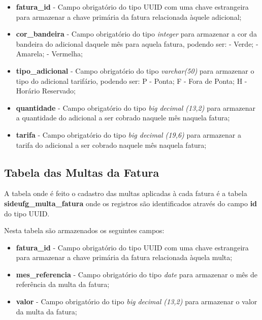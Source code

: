 \begin{itemize}
    \item \textbf{fatura\_id} - Campo obrigatório do tipo UUID com uma chave estrangeira para armazenar a chave primária da fatura relacionada àquele adicional;
    \item \textbf{cor\_bandeira} - Campo obrigatório do tipo \textit{integer} para armazenar a cor da bandeira do adicional daquele mês para aquela fatura, podendo ser:
     - Verde;
     - Amarela;
     - Vermelha;
    \item \textbf{tipo\_adicional} - Campo obrigatório do tipo \textit{varchar(50)} para armazenar o tipo do adicional tarifário, podendo ser:
    \subitem P - Ponta;
    \subitem F - Fora de Ponta;
    \subitem H - Horário Reservado;
    \item \textbf{quantidade} - Campo obrigatório do tipo \textit{big decimal (13,2)} para armazenar a quantidade do adicional a ser cobrado naquele mês naquela fatura;
    \item \textbf{tarifa} - Campo obrigatório do tipo \textit{big decimal (19,6)} para armazenar a tarifa do adicional a ser cobrado naquele mês naquela fatura;
\end{itemize}

\subsection{Tabela das Multas da Fatura}
\label{sub:tabela-multa-fatura}

A tabela onde é feito o cadastro das multas aplicadas à cada fatura é a tabela \textbf{sideufg\_multa\_fatura} onde os registros são identificados através do campo \textbf{id} do tipo UUID.

Nesta tabela são armazenados os seguintes campos:

\begin{itemize}
    \item \textbf{fatura\_id} - Campo obrigatório do tipo UUID com uma chave estrangeira para armazenar a chave primária da fatura relacionada àquela multa;
    \item \textbf{mes\_referencia} - Campo obrigatório do tipo \textit{date} para armazenar o mês de referência da multa da fatura;
    \item \textbf{valor} - Campo obrigatório do tipo \textit{big decimal (13,2)} para armazenar o valor da multa da fatura;
\end{itemize}

